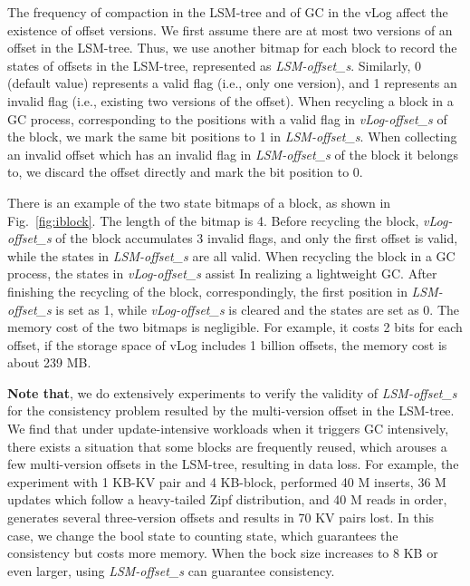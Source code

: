 \documentclass[sigconf]{acmart}
\begin{document}
The frequency of compaction in the LSM-tree and of GC in the vLog affect the existence of offset versions. We first assume there are at most two versions of an offset in the LSM-tree. Thus, we use another bitmap for each block to record the states of offsets in the LSM-tree, represented as \textit{LSM-offset\_s}. Similarly, 0 (default value) represents a valid flag (i.e., only one version), and 1 represents an invalid flag (i.e., existing two versions of the offset). When recycling a block in a GC process, corresponding to the positions with a valid flag in \textit{vLog-offset\_s} of the block, we mark the same bit positions to 1 in \textit{LSM-offset\_s}. When collecting an invalid offset which has an invalid flag in \textit{LSM-offset\_s} of the block it belongs to, we discard the offset directly and mark the bit position to 0.

There is an example of the two state bitmaps of a block, as shown in Fig.~\ref{fig:iblock}. The length of the bitmap is 4. Before recycling the block, \textit{vLog-offset\_s} of the block accumulates 3 invalid flags, and only the first offset is valid, while the states in \textit{LSM-offset\_s} are all valid. When recycling the block in a GC process, the states in \textit{vLog-offset\_s} assist In realizing a lightweight GC. After finishing the recycling of the block, correspondingly, the first position in \textit{LSM-offset\_s} is set as 1, while \textit{vLog-offset\_s} is cleared and the states are set as 0. The memory cost of the two bitmaps is negligible. For example, it costs 2 bits for each offset, if the storage space of vLog includes 1 billion offsets, the memory cost is about 239 MB.

\textbf{Note that}, we do extensively experiments to verify the validity of \textit{LSM-offset\_s} for the consistency problem resulted by the multi-version offset in the LSM-tree. We find that under update-intensive workloads when it triggers GC intensively, there exists a situation that some blocks are frequently reused, which arouses a few multi-version offsets in the LSM-tree, resulting in data loss. For example, the experiment with 1 KB-KV pair and 4 KB-block, performed 40 M inserts, 36 M updates which follow a heavy-tailed Zipf distribution, and 40 M reads in order, generates several three-version offsets and results in 70 KV pairs lost. In this case, we change the bool state to counting state, which guarantees the consistency but costs more memory. When the bock size increases to 8 KB or even larger, using \textit{LSM-offset\_s} can guarantee consistency.
\end{document}
